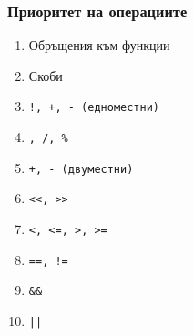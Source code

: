 \documentclass{beamer}
\begin{document}
\begin{frame}
  \frametitle{Приоритет на операциите}
  \begin{enumerate}
  \item Обръщения към функции
  \item Скоби
  \item \tt!, \tt+, \tt- (едноместни)
  \item \tt*, \tt/, \tt\%
  \item \tt+, \tt- (двуместни)
  \item \tt{<{}<}, \tt{>{}>}
  \item \tt{<}, \tt{<=}, \tt{>}, \tt{>=}
  \item \tt{==}, \tt{!=}
  \item \tt{\&\&}
  \item \tt{||}
  \end{enumerate}
\end{frame}
\end{document}
